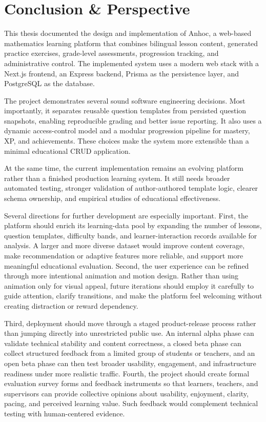 \chapter{Conclusion \& Perspective}

This thesis documented the design and implementation of Anhoc, a web-based mathematics learning platform that combines bilingual lesson content, generated practice exercises, grade-level assessments, progression tracking, and administrative control. The implemented system uses a modern web stack with a Next.js frontend, an Express backend, Prisma as the persistence layer, and PostgreSQL as the database.

The project demonstrates several sound software engineering decisions. Most importantly, it separates reusable question templates from persisted question snapshots, enabling reproducible grading and better issue reporting. It also uses a dynamic access-control model and a modular progression pipeline for mastery, XP, and achievements. These choices make the system more extensible than a minimal educational CRUD application.

At the same time, the current implementation remains an evolving platform rather than a finished production learning system. It still needs broader automated testing, stronger validation of author-authored template logic, clearer schema ownership, and empirical studies of educational effectiveness.

Several directions for further development are especially important. First, the platform should enrich its learning-data pool by expanding the number of lessons, question templates, difficulty bands, and learner-interaction records available for analysis. A larger and more diverse dataset would improve content coverage, make recommendation or adaptive features more reliable, and support more meaningful educational evaluation. Second, the user experience can be refined through more intentional animation and motion design. Rather than using animation only for visual appeal, future iterations should employ it carefully to guide attention, clarify transitions, and make the platform feel welcoming without creating distraction or reward dependency.

Third, deployment should move through a staged product-release process rather than jumping directly into unrestricted public use. An internal alpha phase can validate technical stability and content correctness, a closed beta phase can collect structured feedback from a limited group of students or teachers, and an open beta phase can then test broader usability, engagement, and infrastructure readiness under more realistic traffic. Fourth, the project should create formal evaluation survey forms and feedback instruments so that learners, teachers, and supervisors can provide collective opinions about usability, enjoyment, clarity, pacing, and perceived learning value. Such feedback would complement technical testing with human-centered evidence.

